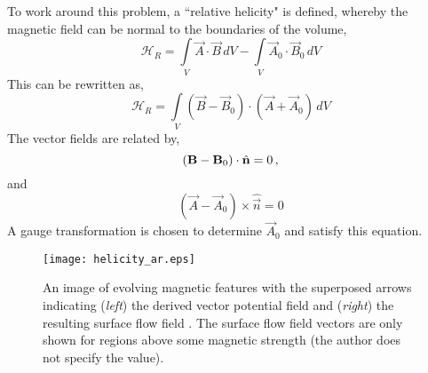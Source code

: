 To work around this problem, a ``relative helicity" is defined, whereby the magnetic field can be normal to the boundaries of the volume,
\begin{equation}
\mathcal{H}_R = \int \limits_V \vec{A}\cdot\vec{B}\,dV - \int \limits_V \vec{A}_0\cdot\vec{B}_0\,dV  
\end{equation}
This can be rewritten as,
\begin{equation}
\mathcal{H}_R = \int \limits_V (\vec{B}-\vec{B}_0)\cdot(\vec{A}+\vec{A}_0)\,dV 
\end{equation}
The vector fields are related by,
\begin{equation}
(\vec{B}-\vec{B}_0)\cdot\hat{\vec{n}} = 0 \mbox{\,,}
\end{equation}
and
\begin{equation}
(\vec{A}-\vec{A}_0)\times\hat{\vec{n}} = 0  
\end{equation}
A gauge transformation is chosen to determine $\vec{A}_0$ and satisfy this equation. 

\begin{figure}[!t]
\centerline{\texttt{[image: helicity\_ar.eps]}}
\caption[An image of evolving magnetic features.]{An image of evolving magnetic features with the superposed arrows indicating (\emph{left}) the derived vector potential field and (\emph{right}) the resulting surface flow field \citep[from][]{Chae:2004}. The surface flow field vectors are only shown for regions above some magnetic strength (the author does not specify the value).}
\label{fig:helicity_ar}
\end{figure}

